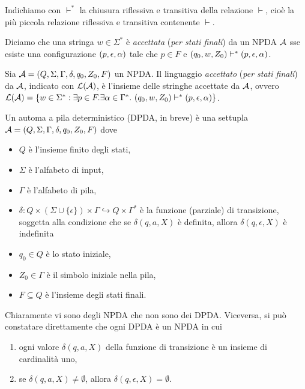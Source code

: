 \documentclass[runningheads,a4paper]{llncs}
\begin{document}
Indichiamo con $\vdash^*$ la chiusura riflessiva e transitiva della relazione $\vdash$, cio\`{e} la pi\`{u} piccola relazione riflessiva e transitiva contenente $\vdash$.

\begin{definition}\label{def:lang-acc-stati-PDA}
Diciamo che una stringa $w \in \Sigma^*$ \`{e} \emph{accettata} (\emph{per stati finali}) da un NPDA $\mathcal{A}$ sse esiste una configurazione $(p,\epsilon,\alpha)$ tale che $p \in F$ e $(q_0,w,Z_0) \vdash^* (p,\epsilon,\alpha)$.
\end{definition}

\begin{definition}\label{def:lang-acc-NPDA}
Sia $\mathcal{A} = (Q,\Sigma,\Gamma,\delta,q_0,Z_0,F)$ un NPDA. Il linguaggio \emph{accettato} (\emph{per stati finali}) da $\mathcal{A}$, indicato con $\mathcal{L}(\mathcal{A})$, \`{e} l'insieme delle stringhe accettate da $\mathcal{A}$, ovvero $\mathcal{L}(\mathcal{A}) = \{w \in \Sigma^* : \exists p \in F.\exists \alpha \in \Gamma^*.\ (q_0,w,Z_0) \vdash^* (p,\epsilon,\alpha) \}$.
\end{definition}

\begin{definition}[DPDA]
Un automa a pila deterministico (DPDA, in breve) \`{e} una settupla $\mathcal{A} = (Q,\Sigma,\Gamma,\delta,q_0,Z_0,F)$ dove 
\begin{itemize}
\item $Q$ \`{e} l'insieme finito degli stati,
\item $\Sigma$ \`{e} l'alfabeto di input,
\item $\Gamma$ \`{e} l'alfabeto di pila,
\item $\delta: Q \times (\Sigma \cup \{\epsilon\}) \times \Gamma \hookrightarrow Q \times \Gamma^*$ \`{e} la funzione (parziale) di transizione, soggetta alla condizione che se $\delta(q,a,X)$ \`{e} definita, allora $\delta(q,\epsilon,X)$ \`{e} indefinita
\item $q_0 \in Q$ \`{e} lo stato iniziale,
\item $Z_0 \in \Gamma$ \`{e} il simbolo iniziale nella pila,
\item $F \subseteq Q$ \`{e} l'insieme degli stati finali.
\end{itemize}
\end{definition}

Chiaramente vi sono degli NPDA che non sono dei DPDA. Viceversa, si pu\`{o} constatare direttamente che ogni DPDA \`{e} un NPDA in cui 
\begin{enumerate}[(1)]
\item ogni valore $\delta(q,a,X)$ della funzione di transizione \`{e} un insieme di cardinalit\`{a} uno,
\item se $\delta(q,a,X) \neq \emptyset$, allora $\delta(q,\epsilon,X) = \emptyset$.
\end{enumerate}
\end{document}
